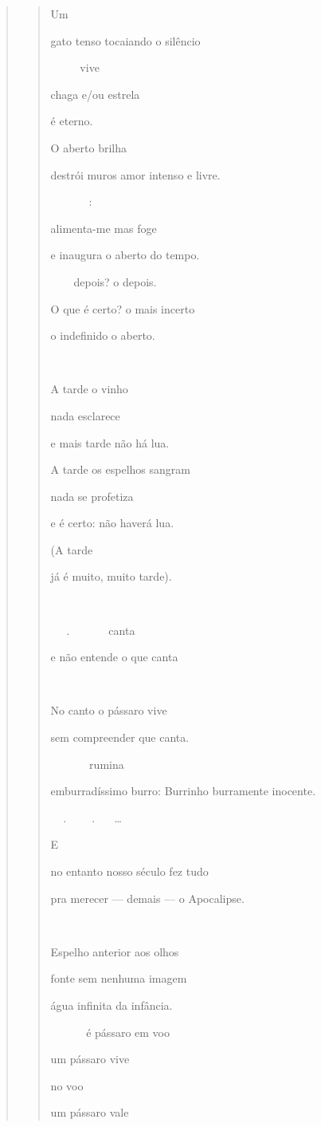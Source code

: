 \begin{verse}
\begin{quote}
Um

gato tenso tocaiando o silêncio

  vive

chaga e/ou estrela

é eterno.

O aberto brilha

destrói muros amor intenso e livre.

 : 

alimenta-me mas foge

e inaugura o aberto do tempo.

  depois? o depois.

O que é certo? o mais incerto

o indefinido o aberto.



A tarde o vinho

nada esclarece

e mais tarde não há lua.

A tarde os espelhos sangram

nada se profetiza

e é certo: não haverá lua.

(A tarde

já é muito, muito tarde).



.   canta

e não entende o que canta



No canto o pássaro vive

sem compreender que canta.

  rumina

emburradíssimo burro: Burrinho burramente inocente.

. . \ldots{}

E

no entanto nosso século fez tudo

pra merecer --- demais --- o Apocalipse.



Espelho anterior aos olhos

fonte sem nenhuma imagem

água infinita da infância.

  é pássaro em voo

um pássaro vive

no voo

um pássaro vale


\end{quote}
\end{verse}
